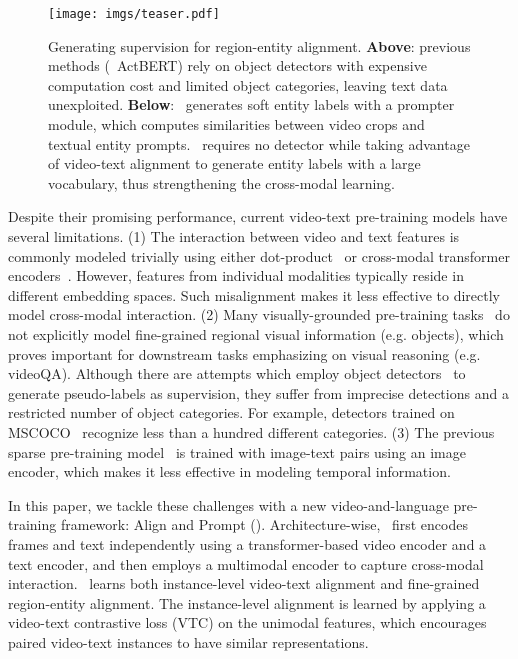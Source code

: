 \documentclass[10pt,twocolumn,letterpaper]{article}
\begin{document}
\begin{figure}
    \centering 
\texttt{[image: imgs/teaser.pdf]}
    \vspace{-15pt}
\caption{Generating supervision for region-entity alignment. \textbf{Above}: previous methods (\eg~ActBERT\cite{zhu2020actbert}) rely on object detectors with expensive computation cost and limited object categories, leaving text data unexploited. \textbf{Below}: \name~generates soft entity labels with a prompter module, which computes similarities between video crops and textual entity prompts. \name~requires no detector while taking advantage of video-text alignment to generate entity labels with a large vocabulary, thus strengthening the cross-modal learning.}
    \label{fig:teaser}
    \vspace{-1em}
\end{figure} 
Despite their promising performance, current video-text pre-training models have several limitations.
(1) The interaction between video and text features is commonly modeled trivially using either dot-product~\cite{miech2019howto100m,miech2020end,Bain21,xu2021videoclip} or cross-modal transformer encoders~\cite{sun2019videobert,zhu2020actbert,li2020hero,lei2021less}. However, features from individual modalities typically reside in different embedding spaces.
Such misalignment makes it less effective to directly model cross-modal interaction.
(2) Many visually-grounded pre-training tasks~\cite{sun2019videobert,li2020hero} do not explicitly model fine-grained regional visual information (e.g. objects),
which proves important for downstream tasks emphasizing on visual reasoning (e.g. videoQA).
Although there are attempts which employ object detectors~\cite{zhu2020actbert,uniter} to generate pseudo-labels as supervision, they suffer from imprecise detections and a restricted number of object categories. For example, detectors trained on MSCOCO~\cite{lin2014microsoft} recognize less than a hundred different categories.
(3) The previous sparse pre-training model~\cite{lei2021less} is trained with image-text pairs using an image encoder, which makes it less effective in modeling temporal information. 

In this paper, we tackle these challenges with a new video-and-language pre-training framework: Align and Prompt (\name). 
Architecture-wise, \name~first encodes frames and text independently using a transformer-based video encoder and a text encoder,
and then employs a multimodal encoder to capture cross-modal interaction.
\name~learns both instance-level video-text alignment and fine-grained region-entity alignment.
The instance-level alignment is learned by applying a video-text contrastive loss (VTC) on the unimodal features,
which encourages paired video-text instances to have similar representations.
\end{document}
